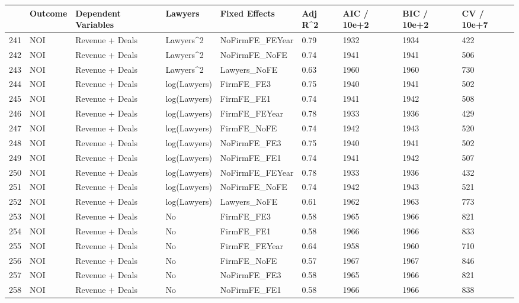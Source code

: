 \begin{table}[ht]
\centering
\begin{tabular}{rllllllll}
  \hline
 & Outcome & Dependent Variables & Lawyers & Fixed Effects & Adj R^2 & AIC / 10e+2 & BIC / 10e+2 & CV / 10e+7 \\ 
  \hline
241 & NOI & Revenue + Deals & Lawyers^2 & NoFirmFE\_FEYear & 0.79 & 1932 & 1934 & 422 \\ 
  242 & NOI & Revenue + Deals & Lawyers^2 & NoFirmFE\_NoFE & 0.74 & 1941 & 1941 & 506 \\ 
  243 & NOI & Revenue + Deals & Lawyers^2 & Lawyers\_NoFE & 0.63 & 1960 & 1960 & 730 \\ 
  244 & NOI & Revenue + Deals & log(Lawyers) & FirmFE\_FE3 & 0.75 & 1940 & 1941 & 502 \\ 
  245 & NOI & Revenue + Deals & log(Lawyers) & FirmFE\_FE1 & 0.74 & 1941 & 1942 & 508 \\ 
  246 & NOI & Revenue + Deals & log(Lawyers) & FirmFE\_FEYear & 0.78 & 1933 & 1936 & 429 \\ 
  247 & NOI & Revenue + Deals & log(Lawyers) & FirmFE\_NoFE & 0.74 & 1942 & 1943 & 520 \\ 
  248 & NOI & Revenue + Deals & log(Lawyers) & NoFirmFE\_FE3 & 0.75 & 1940 & 1941 & 502 \\ 
  249 & NOI & Revenue + Deals & log(Lawyers) & NoFirmFE\_FE1 & 0.74 & 1941 & 1942 & 507 \\ 
  250 & NOI & Revenue + Deals & log(Lawyers) & NoFirmFE\_FEYear & 0.78 & 1933 & 1936 & 432 \\ 
  251 & NOI & Revenue + Deals & log(Lawyers) & NoFirmFE\_NoFE & 0.74 & 1942 & 1943 & 521 \\ 
  252 & NOI & Revenue + Deals & log(Lawyers) & Lawyers\_NoFE & 0.61 & 1962 & 1963 & 773 \\ 
  253 & NOI & Revenue + Deals & No & FirmFE\_FE3 & 0.58 & 1965 & 1966 & 821 \\ 
  254 & NOI & Revenue + Deals & No & FirmFE\_FE1 & 0.58 & 1966 & 1966 & 833 \\ 
  255 & NOI & Revenue + Deals & No & FirmFE\_FEYear & 0.64 & 1958 & 1960 & 710 \\ 
  256 & NOI & Revenue + Deals & No & FirmFE\_NoFE & 0.57 & 1967 & 1967 & 846 \\ 
  257 & NOI & Revenue + Deals & No & NoFirmFE\_FE3 & 0.58 & 1965 & 1966 & 821 \\ 
  258 & NOI & Revenue + Deals & No & NoFirmFE\_FE1 & 0.58 & 1966 & 1966 & 838 \\ 

\end{tabular}
\end{table}
